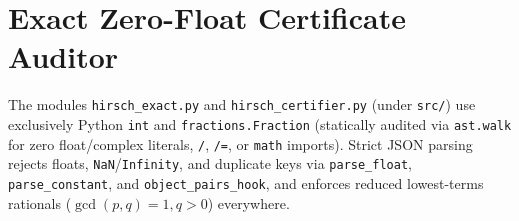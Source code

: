 \documentclass[10pt,twocolumn]{article}
\begin{document}
\section{Exact Zero-Float Certificate Auditor}\label{sec:certifier}
{\raggedright
The modules \texttt{hirsch\_\allowbreak exact.py} and \texttt{hirsch\_\allowbreak certifier.py} (under \texttt{src/}) use exclusively Python \texttt{int} and \texttt{fractions.\allowbreak Fraction} (statically audited via \texttt{ast.walk} for zero float/complex literals, \texttt{/}, \texttt{/=}, or \texttt{math} imports). Strict JSON parsing rejects floats, \texttt{NaN}/\texttt{Infinity}, and duplicate keys via \texttt{parse\_\allowbreak float}, \texttt{parse\_\allowbreak constant}, and \texttt{object\_\allowbreak pairs\_\allowbreak hook}, and enforces reduced lowest-terms rationals ($\gcd(p,q)=1, q>0$) everywhere.

}
\end{document}
